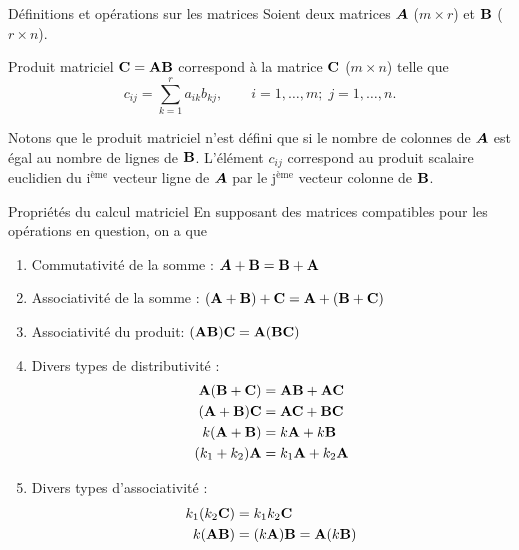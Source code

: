 \documentclass{BeamerAAV}
\begin{document}
\begin{frame}{Définitions et opérations sur les matrices}
Soient deux matrices $\mbox{\boldmath$A$\unboldmath}$ ($m\times r$) et $\bold B$ ($r\times n$).
\begin{bte}{Produit matriciel}
    $\bold{C}=\bold A\bold B$ correspond à la matrice $\bold C$ ($m\times n$) telle que
$$c_{ij}=\sum_{k=1}^r a_{ik}b_{kj}, \qquad i=1,\ldots,m; \; j=1,\ldots,n.$$
\end{bte}
Notons que le produit matriciel n'est défini que si le nombre de colonnes de $\mbox{\boldmath$A$\unboldmath}$ est égal au nombre de lignes de $\bold B$. L'élément $c_{ij}$ correspond au produit scalaire euclidien du i$^\text{ème}$ vecteur ligne de $\mbox{\boldmath$A$\unboldmath}$ par le j$^\text{ème}$ vecteur colonne de $\bold B$.
\end{frame}

\begin{frame}{Propriétés du calcul matriciel}
En supposant des matrices compatibles pour les opérations en question, on a que

\begin{enumerate}[label=(\roman*)]
\item Commutativité de la somme : $\mbox{\boldmath$A$\unboldmath} + \bold B  =  \bold B + \bold A$
\item Associativité de la somme : $(\bold A+\bold B)+\bold C  =  \bold A+ (\bold B+\bold C)$
\item Associativité du produit:  $(\bold A\bold B)\bold C=\bold A(\bold B\bold C)$
\item Divers types de distributivité :
\begin{align*}
  \bold A(\bold B+\bold C)&=\bold A\bold B+\bold A\bold C \\
(\bold A+\bold B)\bold C&=\bold A\bold C+\bold B\bold C \\
k(\bold A+\bold B)&=k\bold A+k\bold B \\
(k_1+k_2)\bold A&=k_1\bold A+k_2\bold A 
\end{align*}

\item Divers types d'associativité : 
\begin{align*}
    k_1(k_2\bold C)&=k_1k_2\bold C \\
    k(\bold A\bold  B)&=(k\bold A) \bold B=\bold A(k\bold B)
\end{align*}
\end{enumerate}
\end{frame}
\end{document}
